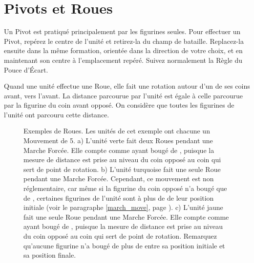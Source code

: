 \newpage
\section{Pivots et Roues}

Un Pivot est pratiqué principalement par les figurines seules. Pour effectuer un Pivot, repérez le centre de l'unité et retirez-la du champ de bataille. Replacez-la ensuite dans la même formation, orientée dans la direction de votre choix, et en maintenant son centre à l'emplacement repéré. Suivez normalement la Règle du Pouce d'Écart.

Quand une unité effectue une Roue, elle fait une rotation autour d'un de ses coins avant, vers l'avant. La distance parcourue par l'unité est égale à celle parcourue par la figurine du coin avant opposé. On considère que toutes les figurines de l'unité ont parcouru cette distance.

\newcommand{\wheelsA}{a)}
\newcommand{\wheelsB}{b)}
\newcommand{\wheelsC}{c)}

\begin{figure}[!htbp]
\centering
\hypertarget{pivotsandwheelsfigure}{
\def\svgwidth{\textwidth}
}
\caption{Exemples de Roues.\vspace*{10pt}\newline
Les unités de cet exemple ont chacune un Mouvement de 5.\vspace*{10pt}\newline
a) L'unité verte fait deux Roues pendant une Marche Forcée. Elle compte comme ayant bougé de , puisque la mesure de distance est prise au niveau du coin opposé au coin qui sert de point de rotation.\vspace*{10pt}\newline
b) L'unité turquoise fait une seule Roue pendant une Marche Forcée. Cependant, ce mouvement est non réglementaire, car même si la figurine du coin opposé n'a bougé que de , certaines figurines de l'unité sont à plus de  de leur position initiale (voir le paragraphe \ref{march_move}, page \pageref{march_move}).\vspace*{10pt}\newline
c) L'unité jaune fait une seule Roue pendant une Marche Forcée. Elle compte comme ayant bougé de , puisque la mesure de distance est prise au niveau du coin opposé au coin qui sert de point de rotation. Remarquez qu'aucune figurine n'a bougé de plus de  entre sa position initiale et sa position finale.}
\label{figure/wheels}
\end{figure}
